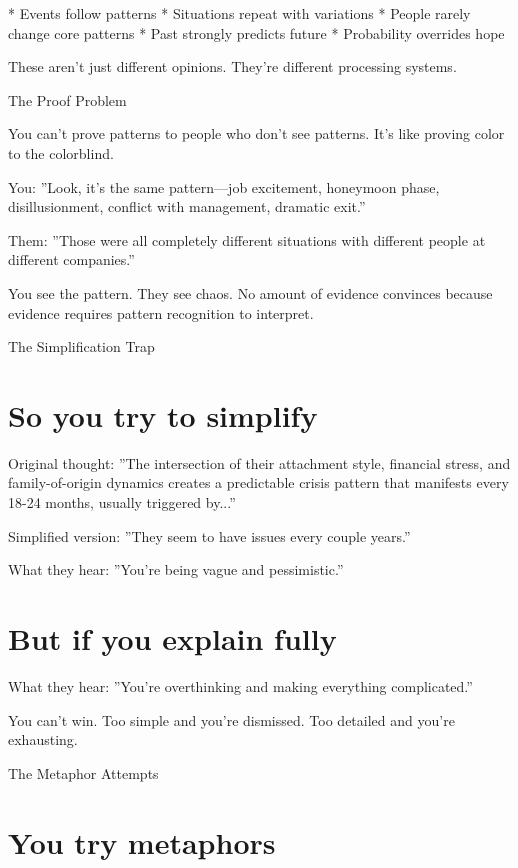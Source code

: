 \documentclass[12pt,oneside]{book}
\begin{document}
                    * Events follow patterns
                    * Situations repeat with variations
                    * People rarely change core patterns
                    * Past strongly predicts future
                    * Probability overrides hope

These aren't just different opinions. They're different processing systems.

The Proof Problem

You can't prove patterns to people who don't see patterns. It's like proving color to the colorblind.

You: ''Look, it's the same pattern---job excitement, honeymoon phase, disillusionment, conflict with management, dramatic exit.''

Them: ''Those were all completely different situations with different people at different companies.''

You see the pattern. They see chaos. No amount of evidence convinces because evidence requires pattern recognition to interpret.

The Simplification Trap

\section{So you try to simplify}

Original thought: ''The intersection of their attachment style, financial stress, and family-of-origin dynamics creates a predictable crisis pattern that manifests every 18-24 months, usually triggered by...''

Simplified version: ''They seem to have issues every couple years.''

What they hear: ''You're being vague and pessimistic.''

\section{But if you explain fully}

What they hear: ''You're overthinking and making everything complicated.''

You can't win. Too simple and you're dismissed. Too detailed and you're exhausting.

The Metaphor Attempts

\section{You try metaphors}
\end{document}

